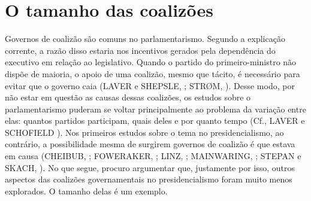 \chapter{O tamanho das coalizões}
\label{chap:revisao}

Governos de coalizão são comuns no parlamentarismo. Segundo a explicação corrente, a razão disso estaria nos incentivos gerados pela dependência do executivo em relação ao legislativo. Quando o partido do primeiro-ministro não dispõe de maioria, o apoio de uma coalizão, mesmo que tácito, é necessário para evitar que o governo caia (LAVER e SHEPSLE, \citeyear{laver1996}; STR\O{}M, \citeyear{strom1990}). Desse modo, por não estar em questão as causas dessas coalizões, os estudos sobre o parlamentarismo puderam se voltar principalmente ao problema da variação entre elas: quantos partidos participam, quais deles e por quanto tempo (Cf., LAVER e SCHOFIELD \citeyear{laver1998}). Nos primeiros estudos sobre o tema no presidencialismo, ao contrário, a possibilidade mesma de surgirem governos de coalizão é que estava em causa (CHEIBUB, \citeyear{cheibub2002}; FOWERAKER, \citeyear{foweraker1998}; LINZ, \citeyear{linz1990}; MAINWARING, \citeyear{mainwaring1993}; STEPAN e SKACH, \citeyear{stepan1993}). No que segue, procuro argumentar que, justamente por isso, outros aspectos das coalizões governamentais no presidencialismo foram muito menos explorados. O tamanho delas é um exemplo.



